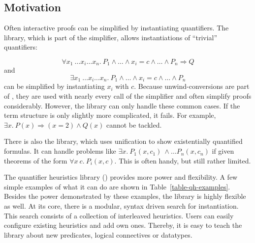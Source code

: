 
\setcounter{sessioncount}{0}

\subsection{Motivation}

Often interactive proofs can be simplified by instantiating
quantifiers. The  library, which is part of the simplifier, allows
instantiations of ``trivial'' quantifiers:

\[ \forall x_1\ \ldots x_i \ldots x_n.\ P_1 \wedge \ldots \wedge x_i = c \wedge \ldots \wedge P_n \Longrightarrow Q \]
and
\[ \exists x_1\ \ldots x_i \ldots x_n.\ P_1 \wedge \ldots \wedge x_i =
c \wedge \ldots \wedge P_n \] can be simplified by
instantiating $x_i$ with $c$. Because unwind-conversions are
part of , they are used with nearly every call of the simplifier
and often simplify proofs considerably. However, the  library can only handle these common cases. If the term structure is
only slightly more complicated, it fails. For example, $\exists x.\ P(x) \Longrightarrow (x = 2) \wedge Q(x)$
cannot be tackled.

There is also the  library, which uses
unification to show existentially quantified formulas. It can handle
problems like $\exists x.\ P_1(x,c_1)\ \wedge \ldots P_n(x,c_n)$ if
given theorems of the form $\forall x\ c.\ P_i(x, c)$. This is often
handy, but still rather limited.

The quantifier heuristics library () provides more power
and flexibility. A few simple examples of what it can do
are shown in Table~\ref{table-qh-examples}. Besides the power demonstrated
by these examples, the library is highly flexible as well.  At its
core, there is a modular, syntax driven search for instantiation.
This search consists of a collection of interleaved heuristics.  Users
can easily configure existing heuristics and add own ones. Thereby, it
is easy to teach the library about new predicates, logical connectives
or datatypes.

